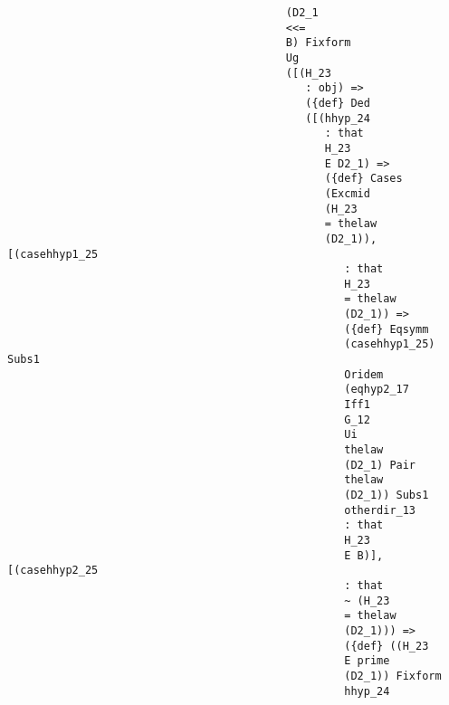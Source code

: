 \documentclass[12pt]{article}
\begin{document}
\begin{verbatim}
                                           (D2_1 
                                           <<= 
                                           B) Fixform 
                                           Ug 
                                           ([(H_23 
                                              : obj) => 
                                              ({def} Ded 
                                              ([(hhyp_24 
                                                 : that 
                                                 H_23 
                                                 E D2_1) => 
                                                 ({def} Cases 
                                                 (Excmid 
                                                 (H_23 
                                                 = thelaw 
                                                 (D2_1)), [(casehhyp1_25 
                                                    : that 
                                                    H_23 
                                                    = thelaw 
                                                    (D2_1)) => 
                                                    ({def} Eqsymm 
                                                    (casehhyp1_25) Subs1 
                                                    Oridem 
                                                    (eqhyp2_17 
                                                    Iff1 
                                                    G_12 
                                                    Ui 
                                                    thelaw 
                                                    (D2_1) Pair 
                                                    thelaw 
                                                    (D2_1)) Subs1 
                                                    otherdir_13 
                                                    : that 
                                                    H_23 
                                                    E B)], [(casehhyp2_25 
                                                    : that 
                                                    ~ (H_23 
                                                    = thelaw 
                                                    (D2_1))) => 
                                                    ({def} ((H_23 
                                                    E prime 
                                                    (D2_1)) Fixform 
                                                    hhyp_24 

\end{verbatim}
\end{document}

